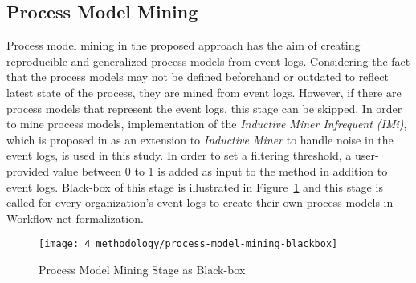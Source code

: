 \subsection{Process Model Mining}
\label{subsec:process-model-mining}
Process model mining in the proposed approach has the aim of creating reproducible and generalized process models from event logs. Considering the fact that the process models may not be defined beforehand or outdated to reflect latest state of the process, they are mined from event logs. However, if there are process models that represent the event logs, this stage can be skipped. In order to mine process models, implementation of the \textit{Inductive Miner Infrequent (IMi)}, which is proposed in \cite{leemans2014discoveringinfrequent} as an extension to \textit{Inductive Miner} to handle noise in the event logs, is used in this study. In order to set a filtering threshold, a user-provided value between 0 to 1 is added as input to the method in addition to event logs. Black-box of this stage is illustrated in Figure~\ref{fig:process-model-mining-blackbox} and this stage is called for every organization's event logs to create their own process models in Workflow net formalization.
\begin{figure}
  \centering
  \texttt{[image: 4\_methodology/process-model-mining-blackbox]}
  \caption{Process Model Mining Stage as Black-box }
  \label{fig:process-model-mining-blackbox}
\end{figure}


